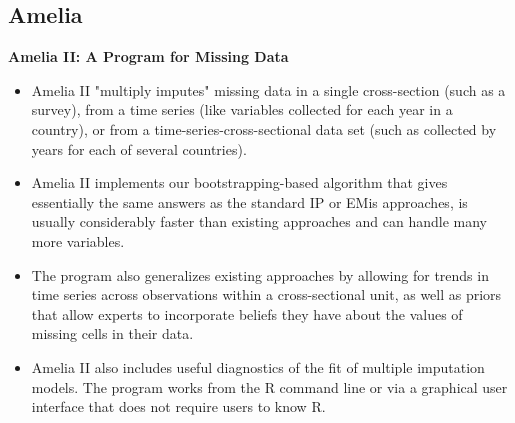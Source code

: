 \subsection{Amelia} 

\textbf{Amelia II: A Program for Missing Data}

\begin{itemize}
\item Amelia II "multiply imputes" missing data in a single cross-section (such as a survey), from a time series (like variables collected for each year in a country), or from a time-series-cross-sectional data set (such as collected by years for each of several countries). 
\item Amelia II implements our bootstrapping-based algorithm that gives essentially the same answers as the standard IP or EMis approaches, is usually considerably faster than existing approaches and can handle many more variables. 


\item The program also generalizes existing approaches by allowing for trends in time series across observations within a cross-sectional unit, as well as priors that allow experts to incorporate beliefs they have about the values of missing cells in their data. 
\item Amelia II also includes useful diagnostics of the fit of multiple imputation models. The program works from the R command line or via a graphical user interface that does not require users to know R.
\end{itemize}

